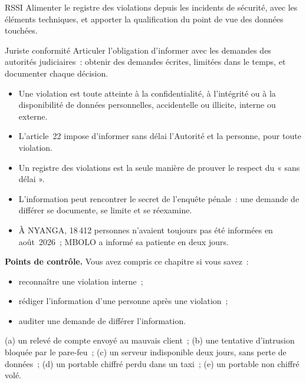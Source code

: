 \begin{boxmetier}{RSSI}
Alimenter le registre des violations depuis les incidents de sécurité, avec
les éléments techniques, et apporter la qualification du point de vue des
données touchées.
\end{boxmetier}

\begin{boxmetier}{Juriste conformité}
Articuler l'obligation d'informer avec les demandes des autorités
judiciaires~: obtenir des demandes écrites, limitées dans le temps, et
documenter chaque décision.
\end{boxmetier}

\begin{boxresume}
\begin{itemize}
    \item Une violation est toute atteinte à la confidentialité, à
          l'intégrité ou à la disponibilité de données personnelles,
          accidentelle ou illicite, interne ou externe.
    \item L'article~22 impose d'informer sans délai l'Autorité et la
          personne, pour toute violation.
    \item Un registre des violations est la seule manière de prouver le
          respect du « sans délai ».
    \item L'information peut rencontrer le secret de l'enquête pénale~: une
          demande de différer se documente, se limite et se réexamine.
    \item À NYANGA, 18\,412 personnes n'avaient toujours pas été informées
          en août~2026~; MBOLO a informé sa patiente en deux jours.
\end{itemize}
\end{boxresume}

\begin{boxinfo}
\textbf{Points de contrôle.} Vous avez compris ce chapitre si vous savez~:
\begin{itemize}
    \item reconnaître une violation interne~;
    \item rédiger l'information d'une personne après une violation~;
    \item auditer une demande de différer l'information.
\end{itemize}
\end{boxinfo}

\begin{boxexo}[title={\ding{45}\quad Exercice~15.1. Violation ou non \niveaubase}]
(a) un relevé de compte envoyé au mauvais client~; (b) une tentative
d'intrusion bloquée par le pare-feu~; (c) un serveur indisponible deux
jours, sans perte de données~; (d) un portable chiffré perdu dans un
taxi~; (e) un portable non chiffré volé.
\end{boxexo}

